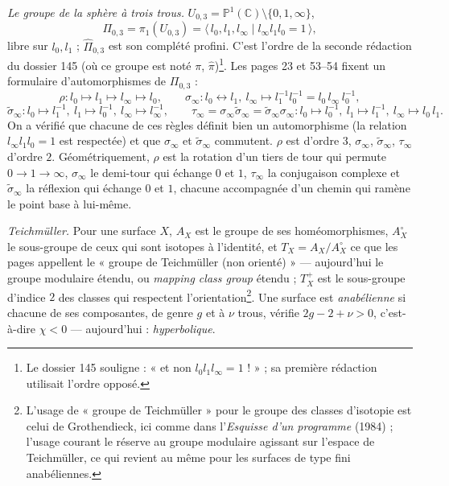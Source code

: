 \documentclass[11pt,a4paper]{article}
\begin{document}
\emph{Le groupe de la sphère à trois trous.} $U_{0,3} =
\mathbb{P}^1(\mathbb{C}) \setminus \{0, 1, \infty\}$,
\[
\Pi_{0,3} = \pi_1(U_{0,3}) = \langle\, l_0, l_1, l_\infty \mid l_\infty l_1 l_0 = 1 \,\rangle ,
\]
libre sur $l_0, l_1$ ; $\widehat\Pi_{0,3}$ est son complété profini. C'est
l'ordre de la seconde rédaction du dossier 145 (où ce groupe est noté $\pi$,
$\widehat\pi$)\footnote{Le dossier 145 souligne : « et non
$l_0 l_1 l_\infty = 1$ ! » ; sa première rédaction utilisait l'ordre
opposé.}. Les pages 23 et 53–54 fixent un formulaire d'automorphismes de
$\Pi_{0,3}$ :
\[
\rho : l_0 \mapsto l_1 \mapsto l_\infty \mapsto l_0, \qquad
\sigma_\infty : l_0 \leftrightarrow l_1,\ l_\infty \mapsto l_1^{-1} l_0^{-1} = l_0\, l_\infty\, l_0^{-1},
\]
\[
\tilde\sigma_\infty : l_0 \mapsto l_1^{-1},\ l_1 \mapsto l_0^{-1},\ l_\infty \mapsto l_\infty^{-1}, \qquad
\tau_\infty = \sigma_\infty\tilde\sigma_\infty = \tilde\sigma_\infty\sigma_\infty : l_0 \mapsto l_0^{-1},\ l_1 \mapsto l_1^{-1},\ l_\infty \mapsto l_0\, l_1 .
\]
On a vérifié que chacune de ces règles définit bien un automorphisme (la
relation $l_\infty l_1 l_0 = 1$ est respectée) et que $\sigma_\infty$ et
$\tilde\sigma_\infty$ commutent. $\rho$ est d'ordre $3$, $\sigma_\infty$,
$\tilde\sigma_\infty$, $\tau_\infty$ d'ordre $2$. Géométriquement, $\rho$
est la rotation d'un tiers de tour qui permute $0 \to 1 \to \infty$,
$\sigma_\infty$ le demi-tour qui échange $0$ et $1$, $\tau_\infty$ la
conjugaison complexe et $\tilde\sigma_\infty$ la réflexion qui échange $0$ et
$1$, chacune accompagnée d'un chemin qui ramène le point base à lui-même.

\emph{Teichmüller.} Pour une surface $X$, $A_X$ est le groupe de ses
homéomorphismes, $A^{\circ}_X$ le sous-groupe de ceux qui sont isotopes à
l'identité, et $T_X = A_X/A^{\circ}_X$ ce que les pages appellent le
« groupe de Teichmüller (non orienté) » — aujourd'hui le groupe modulaire
étendu, ou \emph{mapping class group} étendu ; $T^{+}_X$ est le sous-groupe
d'indice $2$ des classes qui respectent l'orientation\footnote{L'usage de
« groupe de Teichmüller » pour le groupe des classes d'isotopie est celui de
Grothendieck, ici comme dans l'\emph{Esquisse d'un programme} (1984) ;
l'usage courant le réserve au groupe modulaire agissant sur l'espace de
Teichmüller, ce qui revient au même pour les surfaces de type fini
anabéliennes.}. Une surface est \emph{anabélienne} si chacune de ses
composantes, de genre $g$ et à $\nu$ trous, vérifie $2g - 2 + \nu > 0$,
c'est-à-dire $\chi < 0$ — aujourd'hui : \emph{hyperbolique}.
\end{document}
